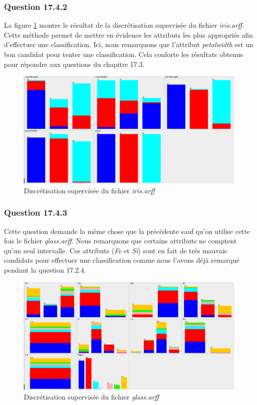 \documentclass[10pt,a4paper]{article}
\begin{document}
			\subsubsection*{Question 17.4.2}
			
			La figure \ref{fig:iris:disc} montre le résultat de la discrétisation supervisée du fichier \textit{iris.arff}. Cette méthode permet de mettre en évidence les attributs les plus appropriés afin d'effectuer une classification. Ici, nous remarquons que l'attribut \textit{petalwidth} est un bon candidat pour tenter une classification. Cela conforte les résultats obtenus pour répondre aux questions du chapitre 17.3.
			
			\begin{figure}[h]
				\centering
				\includegraphics[width=.8\textwidth]{iris_disc}
				\caption{Discrétisation supervisée du fichier \textit{iris.arff}}
				\label{fig:iris:disc}
			\end{figure}
			
			
			\subsubsection*{Question 17.4.3}
			
			Cette question demande la même chose que la précédente sauf qu'on utilise cette fois le fichier \textit{glass.arff}. Nous remarquons que certains attributs ne comptent qu'un seul intervalle. Ces attributs (\textit{Fe} et \textit{Si}) sont en fait de très mauvais candidats pour effectuer une classification comme nous l'avons déjà remarqué pendant la question 17.2.4. 
			
			\begin{figure}[h]
				\centering
				\includegraphics[width=.8\textwidth]{glass_disc_sup}
				\caption{Discrétisation supervisée du fichier \textit{glass.arff}}
				\label{fig:glass:disc:sup}
			\end{figure}
			
\end{document}
